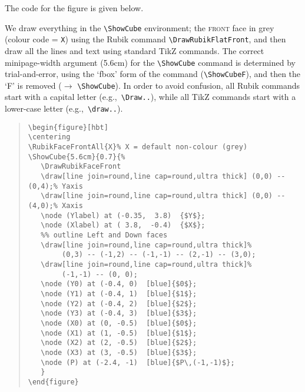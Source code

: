 \documentclass[a4paper]{article}
\begin{document}
\begin{figure}[hbt]
\centering
{}   %
\end{figure}

{\noindent}The code for the figure is given below.

We  draw everything in the  \verb!\ShowCube! environment; the \textsc{front} face
in grey (colour code = \texttt{X}) using the Rubik command 
\verb!\DrawRubikFlatFront!, and then draw all the lines and text using standard 
TikZ commands. The correct  minipage-width argument (5.6cm) for the 
\verb!\ShowCube! command is determined by trial-and-error, using the `fbox' 
form of the command (\verb!\ShowCubeF!), and then the `F' is removed 
($\rightarrow$ \verb!\ShowCube!). In order to avoid confusion, all Rubik commands 
start with a capital letter (e.g.,~\verb!\Draw..!), while all TikZ commands 
start with a lower-case letter (e.g.,~\verb!\draw..!).

\begin{quote}
\begin{verbatim}
\begin{figure}[hbt]
\centering
\RubikFaceFrontAll{X}% X = default non-colour (grey)
\ShowCube{5.6cm}{0.7}{%
   \DrawRubikFaceFront
   \draw[line join=round,line cap=round,ultra thick] (0,0) -- (0,4);% Yaxis
   \draw[line join=round,line cap=round,ultra thick] (0,0) -- (4,0);% Xaxis
   \node (Ylabel) at (-0.35,  3.8)  {$Y$};
   \node (Xlabel) at ( 3.8,  -0.4)  {$X$};
   %% outline Left and Down faces
   \draw[line join=round,line cap=round,ultra thick]%
        (0,3) -- (-1,2) -- (-1,-1) -- (2,-1) -- (3,0);
   \draw[line join=round,line cap=round,ultra thick]%
        (-1,-1) -- (0, 0);
   \node (Y0) at (-0.4, 0)  [blue]{$0$};
   \node (Y1) at (-0.4, 1)  [blue]{$1$};
   \node (Y2) at (-0.4, 2)  [blue]{$2$};
   \node (Y3) at (-0.4, 3)  [blue]{$3$};
   \node (X0) at (0, -0.5)  [blue]{$0$};
   \node (X1) at (1, -0.5)  [blue]{$1$};
   \node (X2) at (2, -0.5)  [blue]{$2$};
   \node (X3) at (3, -0.5)  [blue]{$3$};
   \node (P) at (-2.4, -1)  [blue]{$P\,(-1,-1)$};
   }
\end{figure}
\end{verbatim} 
\end{quote}
\end{document}
